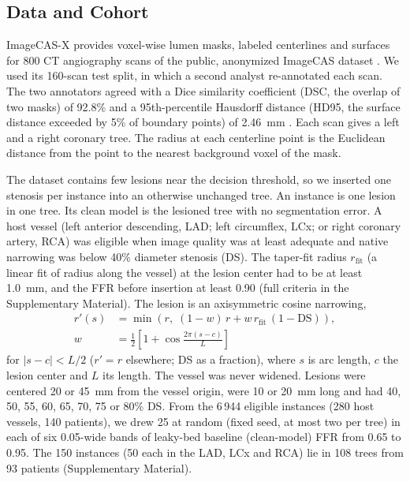 \documentclass[journal,twoside,web]{ieeecolor}
\begin{document}
\subsection{Data and Cohort}
ImageCAS-X provides voxel-wise lumen masks, labeled centerlines and surfaces for 800 CT angiography scans of the
public, anonymized ImageCAS dataset \cite{zeng2023,bransby2026,imagecasx_data}. We used its 160-scan test split, in which a second
analyst re-annotated each scan. The two annotators agreed with a Dice similarity coefficient (DSC, the overlap of two
masks) of 92.8\% and a 95th-percentile Hausdorff distance (HD95, the surface distance exceeded by 5\% of boundary
points) of 2.46~mm \cite{bransby2026}. Each scan gives a left and a right coronary tree. The radius at each centerline point is the Euclidean distance from the point to
the nearest background voxel of the mask.

The dataset contains few lesions near the decision threshold, so we inserted one stenosis per instance into an
otherwise unchanged tree. An instance is one lesion in one tree. Its clean model is the lesioned tree with no segmentation error. A host vessel (left anterior descending, LAD; left circumflex, LCx; or right coronary artery, RCA) was eligible when image quality was at least adequate and native narrowing was below 40\% diameter stenosis (DS). The taper-fit radius $r_\mathrm{fit}$ (a linear fit of radius along the vessel) at the lesion center had to be at least 1.0~mm, and the FFR before insertion at least 0.90 (full criteria in the Supplementary Material). The lesion is an axisymmetric cosine narrowing,
\begin{equation}
\begin{aligned}
r'(s) &= \min\!\left(r,\; (1-w)\,r + w\,r_\mathrm{fit}\,(1-\mathrm{DS})\right),\\
w &= \tfrac{1}{2}\left[1+\cos\tfrac{2\pi (s-c)}{L}\right]
\end{aligned}
\end{equation}
for $|s-c|<L/2$ ($r'=r$ elsewhere; DS as a fraction), where $s$ is arc length, $c$ the lesion center and $L$ its length. The vessel was never widened.
Lesions were centered 20 or 45~mm from the vessel origin, were 10 or 20~mm long and had 40, 50, 55, 60, 65, 70, 75
or 80\% DS. From the 6\,944 eligible instances (280 host vessels, 140 patients), we drew 25 at random (fixed seed, at most two per tree) in each of six 0.05-wide bands of leaky-bed baseline (clean-model) FFR from 0.65 to 0.95. The 150 instances (50 each in the LAD, LCx and RCA) lie in 108 trees from 93 patients (Supplementary Material).
\end{document}

